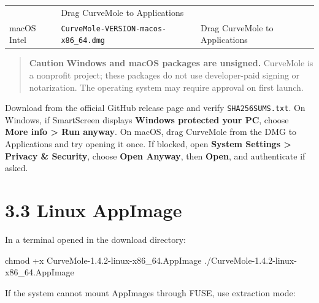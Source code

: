 \documentclass[
  10pt,
  a4paper,
  oneside]{scrreprt}
\newenvironment{Shaded}{}{}
\newcommand{\ExtensionTok}[1]{#1}
\newcommand{\FunctionTok}[1]{\textcolor[rgb]{0.02,0.16,0.49}{#1}}
\newcommand{\NormalTok}[1]{#1}
\begin{document}
\begin{longtable}[]{@{}lll@{}}
\begin{minipage}[t]{0.30\columnwidth}
\end{minipage} & \begin{minipage}[t]{0.30\columnwidth}\raggedright
Drag CurveMole to Applications\strut
\end{minipage}\tabularnewline
\begin{minipage}[t]{0.30\columnwidth}\raggedright
macOS Intel\strut
\end{minipage} & \begin{minipage}[t]{0.30\columnwidth}\raggedright
\texttt{CurveMole-VERSION-macos-x86\_64.dmg}\strut
\end{minipage} & \begin{minipage}[t]{0.30\columnwidth}\raggedright
Drag CurveMole to Applications\strut
\end{minipage}\tabularnewline
\bottomrule
\end{longtable}

\begin{quote}
\textbf{Caution} \textbf{Windows and macOS packages are unsigned.}
CurveMole is a nonprofit project; these packages do not use
developer-paid signing or notarization. The operating system may require
approval on first launch.
\end{quote}

Download from the official GitHub release page and verify
\texttt{SHA256SUMS.txt}. On Windows, if SmartScreen displays
\textbf{Windows protected your PC}, choose \textbf{More info
\textgreater{} Run anyway}. On macOS, drag CurveMole from the DMG to
Applications and try opening it once. If blocked, open \textbf{System
Settings \textgreater{} Privacy \& Security}, choose \textbf{Open
Anyway}, then \textbf{Open}, and authenticate if asked.

\hypertarget{linux-appimage}{%
\section{3.3 Linux AppImage}\label{linux-appimage}}

In a terminal opened in the download directory:

\begin{Shaded}
\begin{Highlighting}[]
\FunctionTok{chmod}\NormalTok{ +x CurveMole{-}1.4.2{-}linux{-}x86\_64.AppImage}
\ExtensionTok{./CurveMole{-}1.4.2{-}linux{-}x86\_64.AppImage}
\end{Highlighting}
\end{Shaded}

If the system cannot mount AppImages through FUSE, use extraction mode:
\end{document}
